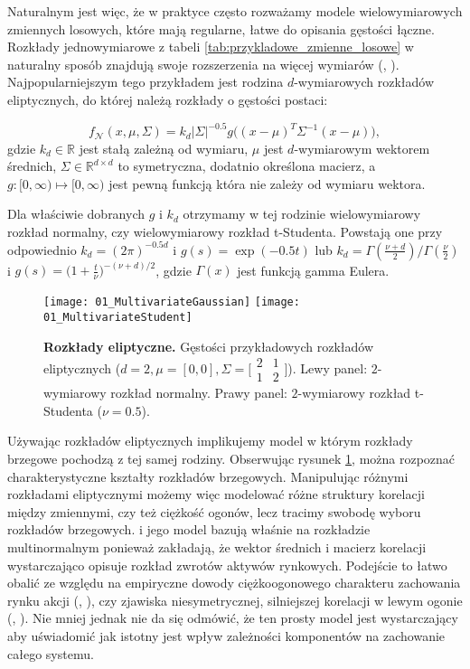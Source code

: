 Naturalnym jest więc, że w praktyce często rozważamy modele wielowymiarowych zmiennych losowych, które mają regularne, łatwe do opisania gęstości łączne. Rozkłady jednowymiarowe z tabeli \ref{tab:przykladowe_zmienne_losowe} w naturalny sposób znajdują swoje rozszerzenia na więcej wymiarów (\cite{MultivariateDistributions}, \cite{Cherubini_Copula_Methods_in_Finance}). Najpopularniejszym tego przykładem jest rodzina $d$-wymiarowych rozkładów eliptycznych, do której należą rozkłady o gęstości postaci:

$$ f_{\mathcal{N}}(x, \mu, \Sigma) = k_d \vert\Sigma\vert^{-0.5}g\big((x-\mu)^T\Sigma^{-1}(x-\mu)\big),$$
gdzie $k_d \in\mathbb{R}$ jest stałą zależną od wymiaru, $\mu$ jest $d$-wymiarowym wektorem średnich, $\Sigma \in \mathbb{R}^{d \times d}$ to symetryczna, dodatnio określona macierz, a $g \colon [0, \infty) \mapsto [0, \infty)$ jest pewną funkcją która nie zależy od wymiaru wektora.

Dla właściwie dobranych $g$ i $k_d$ otrzymamy w tej rodzinie wielowymiarowy rozkład normalny, czy wielowymiarowy rozkład t-Studenta. Powstają one przy odpowiednio $k_d=(2\pi)^{-0.5d}$ i $g(s) = \exp(-0.5 t)$ lub $k_d=\Gamma(\frac{\nu + d}{2})/\Gamma(\frac{\nu}{2})$ i $g(s) = \big(1 + \frac{t}{\nu})^{-(\nu + d)/2}$, gdzie $\Gamma(x)$ jest funkcją gamma Eulera.
\begin{figure}[H]
	\centering
	\texttt{[image: 01\_MultivariateGaussian]}	\texttt{[image: 01\_MultivariateStudent]}
	\caption{\textbf{Rozkłady eliptyczne.} Gęstości przykładowych rozkładów eliptycznych ($d=2, \mu=[0, 0], \Sigma = \big[\begin{smallmatrix}2&1\\1&2\end{smallmatrix}\big]$). Lewy panel: $2$-wymiarowy rozkład normalny. Prawy panel: $2$-wymiarowy rozkład t-Studenta ($\nu = 0.5$).\label{fig:multivariate_gaussian_student}}
\end{figure}

Używając rozkładów eliptycznych implikujemy model w którym rozkłady brzegowe pochodzą z tej samej rodziny. Obserwując rysunek \ref{fig:multivariate_gaussian_student}, można rozpoznać charakterystyczne kształty rozkładów brzegowych. Manipulując różnymi rozkładami eliptycznymi możemy więc modelować różne struktury korelacji między zmiennymi, czy też ciężkość ogonów, lecz tracimy swobodę wyboru rozkładów brzegowych. \cite{Markovitz_MPT} i jego model bazują właśnie na rozkładzie multinormalnym ponieważ zakładają, że wektor średnich i macierz korelacji wystarczająco opisuje rozkład zwrotów aktywów rynkowych. Podejście to łatwo obalić ze względu na empiryczne dowody ciężkoogonowego charakteru zachowania rynku akcji (\cite{Taleb_BS_is_BS}, \cite{Mandelbrot_NonGaussianity}), czy zjawiska niesymetrycznej, silniejszej korelacji w lewym ogonie (\cite{Taleb_BS_is_BS}, \cite{AssymetricEquityDependency}). Nie mniej jednak nie da się odmówić, że ten prosty model jest wystarczający aby uświadomić jak istotny jest wpływ zależności komponentów na zachowanie całego systemu.\\
